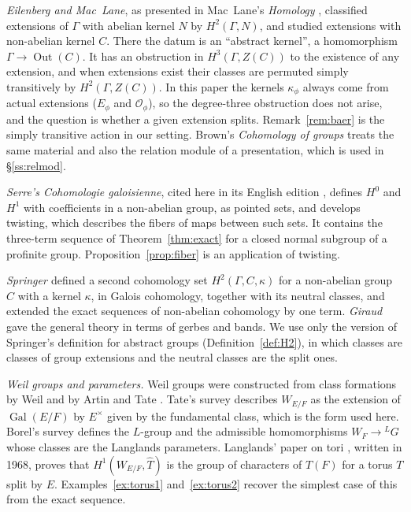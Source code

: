\documentclass[12pt,letterpaper]{article}
\numberwithin{equation}{section}
\theoremstyle{plain}
\theoremstyle{definition}
\newcommand{\Th}{\widehat{T}}
\newcommand{\LG}{{}^{L}G}
\DeclareMathOperator{\Out}{Out}
\DeclareMathOperator{\Gal}{Gal}
\begin{document}
\emph{Eilenberg and Mac~Lane}, as presented in Mac~Lane's \emph{Homology}
\cite[Ch.~IV]{ML63}, classified extensions of $\Gamma$ with abelian kernel
$N$ by $H^2(\Gamma,N)$, and studied extensions with non-abelian kernel
$C$. There the datum is an ``abstract kernel'', a homomorphism
$\Gamma\to\Out(C)$. It has an obstruction in $H^3(\Gamma,Z(C))$ to the
existence of any extension, and when extensions exist their classes are
permuted simply transitively by $H^2(\Gamma,Z(C))$. In this paper the
kernels $\kappa_\phi$ always come from actual extensions ($E_\phi$ and
$\mathcal{O}_\phi$), so the degree-three obstruction does not arise, and
the question is whether a given extension splits. Remark~\ref{rem:baer}
is the simply transitive action in our setting. Brown's \emph{Cohomology
of groups} \cite[Ch.~II and~IV]{Br82} treats the same material and also
the relation module of a presentation, which is used in
\S\ref{ss:relmod}.

\emph{Serre's \emph{Cohomologie galoisienne}}, cited here in its English
edition \cite[Ch.~I, \S5]{Se97}, defines $H^0$ and $H^1$ with
coefficients in a non-abelian group, as pointed sets, and develops
twisting, which describes the fibers of maps between such sets. It
contains the three-term sequence of Theorem~\ref{thm:exact} for a closed
normal subgroup of a profinite group. Proposition~\ref{prop:fiber} is an
application of twisting.

\emph{Springer \cite{Sp66}} defined a second cohomology set
$H^2(\Gamma,C,\kappa)$ for a non-abelian group $C$ with a kernel
$\kappa$, in Galois cohomology, together with its neutral classes, and
extended the exact sequences of non-abelian cohomology by one term.
\emph{Giraud \cite{Gi71}} gave the general theory in terms of gerbes and
bands. We use only the version of Springer's definition for abstract
groups (Definition~\ref{def:H2}), in which classes are classes of group
extensions and the neutral classes are the split ones.

\emph{Weil groups and parameters.} Weil groups were constructed from
class formations by Weil and by Artin and Tate \cite[Ch.~XV]{AT68}. Tate's
survey \cite[\S1]{Ta79} describes $W_{E/F}$ as the extension of
$\Gal(E/F)$ by $E^\times$ given by the fundamental class, which is the
form used here. Borel's survey \cite{Bo79} defines the $L$-group and the
admissible homomorphisms $W_F\to\LG$ whose classes are the Langlands
parameters. Langlands' paper on tori \cite{La97}, written in 1968,
proves that $H^1(W_{E/F},\Th)$ is the group of characters of $T(F)$ for a
torus $T$ split by $E$. Examples~\ref{ex:torus1} and~\ref{ex:torus2}
recover the simplest case of this from the exact sequence.
\end{document}
